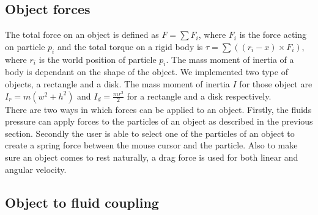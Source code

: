\subsection{Object forces}
The total force on an object is defined as $F = \sum{F_i}$, where $F_i$ is the force acting on particle $p_i$ and the total torque on a rigid body is $\tau = \sum{((r_i - x) \times F_i)}$, where $r_i$ is the world position of particle $p_i$. The mass moment of inertia of a body is dependant on the shape of the object. We implemented two type of objects, a rectangle and a disk. The mass moment of inertia $I$ for those object are $I_r =  m (w^2 + h^2)$ and $I_d = \frac{mr^2}{2}$ for a rectangle and a disk respectively.\\
There are two ways in which forces can be applied to an object. Firstly, the fluids pressure can apply forces to the particles of an object as described in the previous section. Secondly the user is able to select one of the particles of an object to create a spring force between the mouse cursor and the particle. Also to make sure an object comes to rest naturally, a drag force is used for both linear and angular velocity.

\subsection{Object to fluid coupling}
